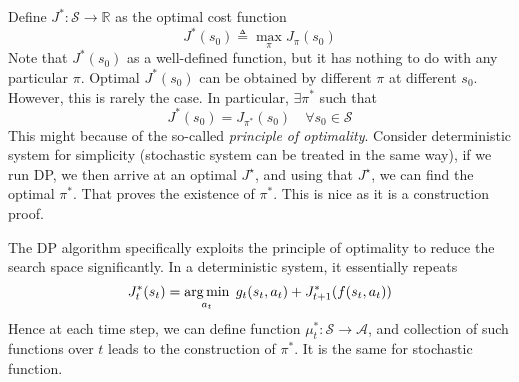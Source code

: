 \documentclass[11pt,a4paper]{article}
\begin{document}
Define $J^{*}: \mathcal{S} \to \mathbb{R}$ as the optimal cost function
\begin{equation}
\label{def:optimial_J}
J^{*}(s_0) \triangleq \max_{\pi} J_{\pi}(s_0) 
\end{equation} 
Note that $J^{*}(s_0)$ as a well-defined function, but it has nothing to do with any particular $\pi$.
Optimal $J^{*}(s_0)$ can be obtained by different $\pi$ at different $s_0$.
{\blue However, this is rarely the case.} In particular, $\exists \pi^{*}$ such that
\[
    J^{*}(s_0) = J_{\pi^{*}}(s_0) \quad \forall s_0 \in \mathcal{S}
\] 
This might because of the so-called \textit{principle of optimality}. Consider deterministic system for simplicity (stochastic system can be treated in the same way), if we run DP, we then arrive at an optimal $J^{\star }$, and using that $J^{\star }$, we can find the optimal $\pi^{*}$. That proves the existence of $\pi^{*}$. This is nice as it is a construction proof.

The DP algorithm specifically exploits the principle of optimality to reduce the search space significantly.
In a deterministic system, it essentially repeats
\[
J^{*}_t(s_{t}) = \operatorname*{arg\,min}_{a_t} \; g_t(s_t, a_t) + J^{*}_{t+1}(f(s_t, a_t))
\] 
Hence at each time step, we can define function $\mu^{*}_t: \mathcal{S} \to \mathcal{A}$, and collection of such functions over $t$ leads to the construction of $\pi^{*}$. It is the same for stochastic function.
\end{document}
